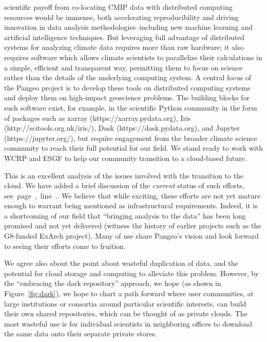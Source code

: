 \documentclass[gmd,manuscript]{copernicus}
\newcommand{\plref}[1]{\mbox{see page \pageref{p-#1}, line
    \lineref{l-#1}.}}
\newenvironment{answer}{\color{blue}}{}
\begin{document}
\begin{enumerate}[label=SC1-\arabic*,leftmargin=*]
  scientific payoff from co-locating CMIP data with distributed
  computing resources would be immense, both accelerating
  reproducibility and driving innovation in data analysis
  methodologies–including new machine learning and artificial
  intelligence techniques. But leveraging full advantage of
  distributed systems for analyzing climate data requires more than
  raw hardware; it also requires software which allows climate
  scientists to parallelize their calculations in a simple, efficient
  and transparent way, permitting them to focus on science rather than
  the details of the underlying computing system. A central focus of
  the Pangeo project is to develop these tools on distributed
  computing systems and deploy them on high-impact geoscience
  problems. The building blocks for such software exist, for example,
  in the scientific Python community in the form of packages such as
  xarray (https://xarray.pydata.org), Iris
  (http://scitools.org.uk/iris/), Dask (https://dask.pydata.org), and
  Jupyter (https://jupyter.org/), but require engagement from the
  broader climate science community to reach their full potential for
  our field. We stand ready to work with WCRP and ESGF to help our
  community transition to a cloud-based future.
\end{enumerate}

\begin{answer}
  This is an excellent analysis of the issues involved with the
  transition to the cloud. We have added a brief discussion of the
  \emph{current} status of such efforts, \plref{SC1-1}. We believe
  that while exciting, these efforts are not yet mature enough to
  warrant being mentioned as infrastructural requirements. Indeed, it
  is a shortcoming of our field that ``bringing analysis to the data''
  has been long promised and not yet delivered (witness the history of
  earlier projects such as the G8-funded ExArch project). Many
  of use share Pangeo's vision and look forward to seeing their
  efforts come to fruition.

  We agree also about the point about wasteful duplication of data,
  and the potential for cloud storage and computing to alleviate this
  problem. However, by the ``embracing the dark repository'' approach,
  we hope (as shown in Figure~\ref{fig:dark}), we hope to chart a path
  forward where user communities, at large institutions or consortia
  around particular scientific interests, can build their own shared
  repositories, which can be thought of as private clouds. The most
  wasteful use is for individual scientists in neighboring offices to
  download the same data onto their separate private stores.
\end{answer}
\end{document}
